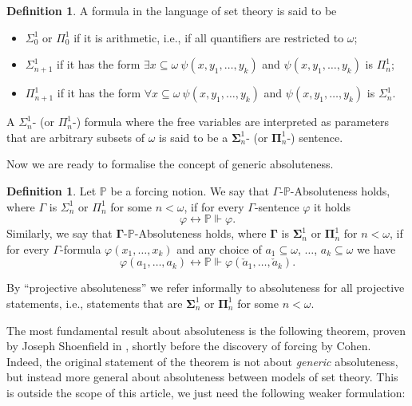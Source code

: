 \documentclass[10pt]{amsart}
\theoremstyle{definition}
\newtheorem{definition}[theorem]{Definition}
\begin{document}
\begin{definition}
    A formula in the language of set theory is said to be
    \begin{itemize}
        \item $\Sigma^1_0$ or $\Pi^1_0$ if it is arithmetic, i.e., if all quantifiers are restricted to $\omega$;
        \item $\Sigma^1_{n+1}$ if it has the form $\exists x\subseteq\omega\ \psi(x,y_1,\ldots,y_k)$ and $\psi(x,y_1,\ldots,y_k)$ is $\Pi^1_n$;
        \item $\Pi^1_{n+1}$ if it has the form $\forall x\subseteq\omega\ \psi(x,y_1,\ldots,y_k)$ and $\psi(x,y_1,\ldots,y_k)$ is $\Sigma^1_n$.
        \end{itemize}
        A $\Sigma^1_n$- (or $\Pi^1_n$-) formula where the free variables are interpreted as parameters that are arbitrary subsets of $\omega$ is said to be a $\boldsymbol\Sigma^1_n$- (or $\boldsymbol\Pi^1_n$-) sentence.
\end{definition}

Now we are ready to formalise the concept of generic absoluteness.

\begin{definition}
    Let $\mathbb P$ be a forcing notion. We say that $\Gamma$-$\mathbb P$-Absoluteness holds, where $\Gamma$ is $\Sigma^1_n$ or $\Pi^1_n$ for some $n<\omega$, if for every $\Gamma$-sentence $\varphi$ it holds
    \[\varphi \leftrightarrow \mathbb P\Vdash \varphi.\]
    Similarly, we say that $\boldsymbol\Gamma$-$\mathbb P$-Absoluteness holds, where $\boldsymbol\Gamma$ is $\boldsymbol\Sigma^1_n$ or $\boldsymbol\Pi^1_n$ for $n<\omega$, if for every $\Gamma$-formula $\varphi(x_1,\ldots, x_k)$ and any choice of $a_1\subseteq\omega$, $\ldots$, $a_k\subseteq\omega$ we have
    \[\varphi(a_1,\ldots,a_k) \leftrightarrow \mathbb P\Vdash \varphi(\check a_1,\ldots,\check a_k).\]
\end{definition}

By ``projective absoluteness'' we refer informally to absoluteness for all projective statements, i.e., statements that are $\boldsymbol\Sigma^1_n$ or $\boldsymbol\Pi^1_n$ for some $n<\omega$.\medskip

The most fundamental result about absoluteness is the following theorem, proven by Joseph Shoenfield in \cite{Shoenfield}, shortly before the discovery of forcing by Cohen. Indeed, the original statement of the theorem is not about \emph{generic} absoluteness, but instead more general about absoluteness between models of set theory. This is outside the scope of this article, we just need the following weaker formulation:
\end{document}
